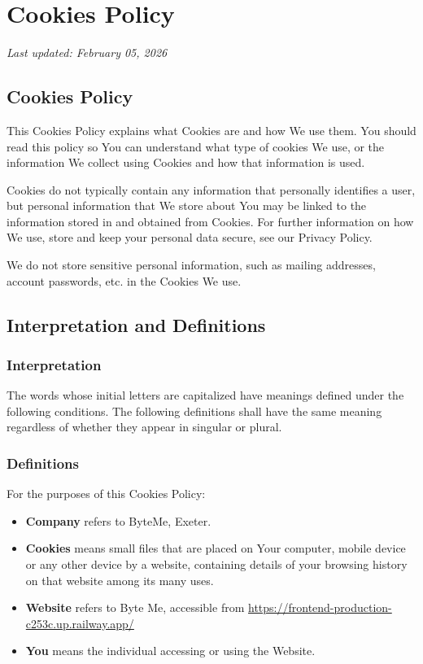 \documentclass[11pt, a4paper]{report}
\begin{document}
\chapter{Cookies Policy}
\textit{Last updated: February 05, 2026}
\bigskip

\section*{Cookies Policy}
This Cookies Policy explains what Cookies are and how We use them. You should read this policy so You can understand what type of cookies We use, or the information We collect using Cookies and how that information is used.

Cookies do not typically contain any information that personally identifies a user, but personal information that We store about You may be linked to the information stored in and obtained from Cookies. For further information on how We use, store and keep your personal data secure, see our Privacy Policy.

We do not store sensitive personal information, such as mailing addresses, account passwords, etc. in the Cookies We use.

\section*{Interpretation and Definitions}

\subsection*{Interpretation}
The words whose initial letters are capitalized have meanings defined under the following conditions. The following definitions shall have the same meaning regardless of whether they appear in singular or plural.

\subsection*{Definitions}
For the purposes of this Cookies Policy:

\begin{itemize}
	\item \textbf{Company} refers to ByteMe, Exeter.
	\item \textbf{Cookies} means small files that are placed on Your computer, mobile device or any other device by a website, containing details of your browsing history on that website among its many uses.
	\item \textbf{Website} refers to Byte Me, accessible from \url{https://frontend-production-c253c.up.railway.app/}
	\item \textbf{You} means the individual accessing or using the Website.
\end{itemize}
\end{document}
